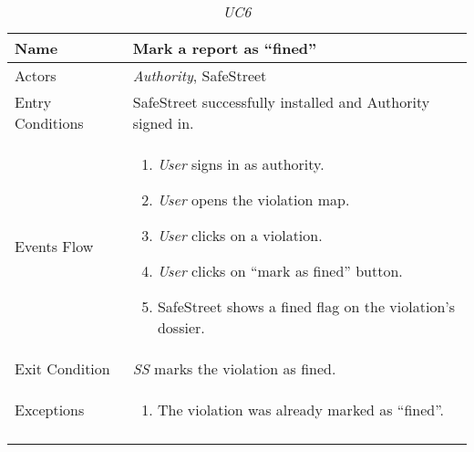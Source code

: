 \documentclass[../../../RASD.tex]{subfiles}
\begin{document}
    \begin{center}
        \begin{longtable}{| p{.35\linewidth} | p{.65\linewidth} |}
            \hline
            \textbf{Name} & \textbf{Mark a report as “fined”}\\ \hline
            Actors & \textit{Authority}, SafeStreet\\ \hline
            Entry Conditions & SafeStreet successfully installed and Authority signed in.\\ \hline
            Events Flow &
            \begin{enumerate}
                \item \textit{User} signs in as authority.
                \item \textit{User} opens the violation map.
                \item \textit{User} clicks on a violation.
                \item \textit{User} clicks on “mark as fined” button.
                \item SafeStreet shows a fined flag on the violation’s dossier.
            \end{enumerate}
            \\ \hline
            Exit Condition & \textit{SS} marks the violation as fined.\\ \hline
            Exceptions &
            \begin{enumerate}
                \item The violation was already marked as “fined”.
            \end{enumerate}
            \\
            \hline
            \caption{\textit{UC6}}
        \end{longtable}
    \end{center}
    \newpage
\end{document}
